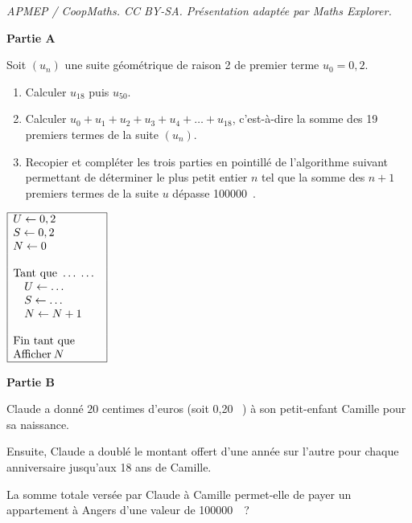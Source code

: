 \documentclass[10pt]{article}
\providecommand{\euro}{\texteuro}
\providecommand{\np}[2][]{{#2~#1}}
\providecommand{\euro}{{\text{€}}}
\renewcommand{\euro}{\ifmmode\text{\texteuro}\else\texteuro\fi}
\begin{document}
\noindent\textit{APMEP / CoopMaths. CC BY-SA. Présentation adaptée par Maths Explorer.}\par\medskip
\medskip

\textbf{Partie A}

\medskip 

Soit $\left(u_n\right)$ une suite géométrique de raison 2 de premier terme $u_0 = 0,2$.

\medskip

\begin{enumerate}
\item Calculer $u_{18}$ puis $u_{50}$.
\item Calculer $u_0 + u_1 + u_2 + u_3 + u_4 + \ldots + u_{18}$, c'est-à-dire la somme des 19
premiers termes de la suite $\left(u_n\right)$.
\item Recopier et compléter les trois parties en pointillé de l'algorithme suivant permettant de déterminer le plus petit entier $n$ tel que la somme des $n + 1$ premiers termes de la suite $u$ dépasse \np{100000}.
\end{enumerate}

\begin{center}
$\begin{array}{|l|}\hline
U \gets  0,2\\
S \gets 0,2\\
N \gets 0\\
~\\
\text{Tant que }\ldots\;\ldots\\
\quad U \gets \ldots\\
\quad S \gets \ldots\\
\quad N \gets N + 1\\
~\\
\text{Fin tant que}~~~~~~~\\
\text{Afficher}\: N\\ \hline
\end{array}$
\end{center}

\medskip

\textbf{Partie B}

\medskip

Claude a donné $20$ centimes d'euros (soit 0,20 ~\euro) à son petit-enfant Camille pour sa naissance. 

Ensuite, Claude a doublé le montant offert d'une année sur l'autre pour chaque anniversaire jusqu'aux 18 ans de Camille.

La somme totale versée par Claude à Camille permet-elle de payer un appartement à Angers d'une valeur de \np{100000}~\euro ?

\bigskip
\end{document}

